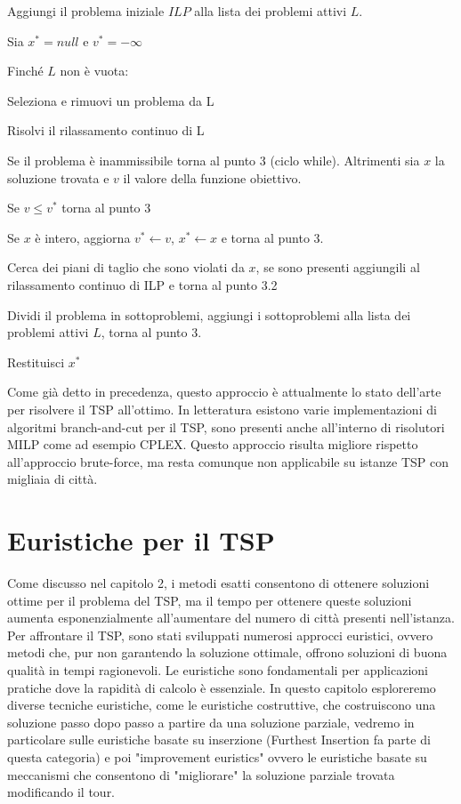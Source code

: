\documentclass[a4paper,12pt]{report}
\begin{document}
\begin{tcolorbox}[colframe=black,colback=white,boxrule=0.5pt, sharp corners]
\begin{legal}
  \item Aggiungi il problema iniziale $ILP$ alla lista dei problemi attivi $L$.
  \item Sia $x^* = null$ e $v^* = -\infty$
  \item Finché $L$ non è vuota:
  \begin{legal}
    \item Seleziona e rimuovi un problema da L
    \item Risolvi il rilassamento continuo di L
    \item Se il problema è inammissibile torna al punto 3 (ciclo while). Altrimenti sia $x$ la soluzione trovata e $v$ il valore della funzione obiettivo.
    \item Se $v \leq v^*$ torna al punto 3
    \item Se $x$ è intero, aggiorna $v^* \leftarrow v$, $x^* \leftarrow x$ e torna al punto 3.
    \item Cerca dei piani di taglio che sono violati da $x$, se sono presenti aggiungili al rilassamento continuo di ILP e torna al punto 3.2
    \item Dividi il problema in sottoproblemi, aggiungi i sottoproblemi alla lista dei problemi attivi $L$, torna al punto 3.
  \end{legal}
  \item Restituisci $x^*$


\end{legal}
\end{tcolorbox}
\hfill \break
Come già detto in precedenza, questo approccio è attualmente lo stato dell'arte per risolvere il TSP all'ottimo. In letteratura esistono varie implementazioni di algoritmi branch-and-cut per il TSP\cite{Branch and Cut Algoritmhs}, sono presenti anche all'interno di risolutori MILP come ad esempio CPLEX. Questo approccio risulta migliore rispetto all'approccio brute-force, ma resta comunque non applicabile su istanze TSP con migliaia di città.

\chapter{Euristiche per il TSP}
Come discusso nel capitolo 2, i metodi esatti consentono di ottenere soluzioni ottime per il problema del TSP, ma il tempo per ottenere queste soluzioni aumenta esponenzialmente all'aumentare del numero di città presenti nell'istanza. Per affrontare il TSP, sono stati sviluppati numerosi approcci euristici, ovvero metodi che, pur non garantendo la soluzione ottimale, offrono soluzioni di buona qualità in tempi ragionevoli. Le euristiche sono fondamentali per applicazioni pratiche dove la rapidità di calcolo è essenziale. In questo capitolo esploreremo diverse tecniche euristiche, come le euristiche costruttive, che costruiscono una soluzione passo dopo passo a partire da una soluzione parziale, vedremo in particolare sulle euristiche basate su inserzione (Furthest Insertion fa parte di questa categoria) e poi "improvement euristics" ovvero le euristiche basate su meccanismi che consentono di "migliorare" la soluzione parziale trovata modificando il tour.
\end{document}
